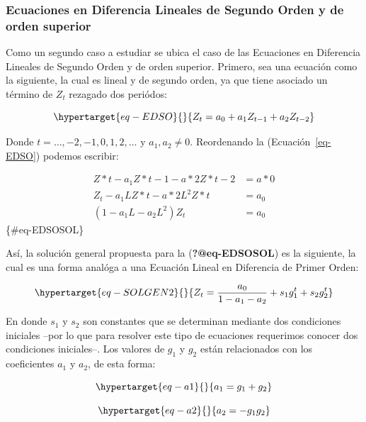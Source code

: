 \documentclass[
  a4paper,
]{article}
\begin{document}
\hypertarget{ecuaciones-en-diferencia-lineales-de-segundo-orden-y-de-orden-superior}{%
\subsubsection{Ecuaciones en Diferencia Lineales de Segundo Orden y de
orden
superior}\label{ecuaciones-en-diferencia-lineales-de-segundo-orden-y-de-orden-superior}}

Como un segundo caso a estudiar se ubica el caso de las Ecuaciones en
Diferencia Lineales de Segundo Orden y de orden superior. Primero, sea
una ecuación como la siguiente, la cual es lineal y de segundo orden, ya
que tiene asociado un término de \(Z_t\) rezagado dos periódos:

\begin{equation}\protect\hypertarget{eq-EDSO}{}{
Z_t = a_0 + a_1 Z_{t-1} + a_2 Z_{t-2}
}\label{eq-EDSO}\end{equation}

Donde \(t = \ldots, -2, -1, 0, 1, 2, \ldots\) y \(a_1, a_2 \neq 0\).
Reordenando la (Ecuación~\ref{eq-EDSO}) podemos escribir:

\begin{align}
Z*t - a_1 Z*{t-1} - a*2 Z*{t-2} & = a*0 \nonumber \\
Z_t - a_1 L Z*{t} - a*2 L^2 Z*{t} & = a_0 \nonumber \\
(1 - a_1 L - a_2 L^2)Z_t & = a_0
\end{align} \{\#eq-EDSOSOL\}

Así, la solución general propuesta para la (\textbf{?@eq-EDSOSOL}) es la
siguiente, la cual es una forma analóga a una Ecuación Lineal en
Diferencia de Primer Orden:

\begin{equation}\protect\hypertarget{eq-SOLGEN2}{}{
Z_t = \frac{a_0}{1 - a_1 - a_2} + s_1 g^t_1 + s_2 g^t_2
}\label{eq-SOLGEN2}\end{equation}

En donde \(s_1\) y \(s_2\) son constantes que se determinan mediante dos
condiciones iniciales --por lo que para resolver este tipo de ecuaciones
requerimos conocer dos condiciones iniciales--. Los valores de \(g_1\) y
\(g_2\) están relacionados con los coeficientes \(a_1\) y \(a_2\), de
esta forma:

\begin{equation}\protect\hypertarget{eq-a1}{}{
a_1 = g_1 + g_2
}\label{eq-a1}\end{equation}

\begin{equation}\protect\hypertarget{eq-a2}{}{
a_2  =  - g_1 g_2
}\label{eq-a2}\end{equation}
\end{document}
